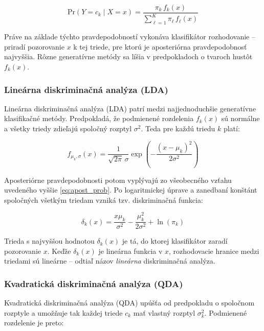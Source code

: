 \begin{equation}\label{eq:apost_prob}
\mathrm{Pr}(Y = c_k \mid X = x) = \frac{\pi_k \, f_k(x)}{\sum\limits_{\ell = 1}^{K} \pi_\ell \, f_\ell(x)}
\end{equation}

Práve na základe týchto pravdepodobností vykonáva klasifikátor rozhodovanie – priradí pozorovanie $x$ k tej triede, pre ktorú je aposteriórna pravdepodobnosť najvyššia. Rôzne generatívne metódy sa líšia v predpokladoch o tvaroch hustôt $f_k(x)$.

\subsubsection{Lineárna diskriminačná analýza (LDA)}
\label{subsubsec:lda}

Lineárna diskriminačná analýza (LDA) patrí medzi najjednoduchšie generatívne klasifikačné metódy. Predpokladá, že podmienené rozdelenia $f_k(x)$ sú normálne a všetky triedy zdieľajú spoločný rozptyl $\sigma^2$. Teda pre každú triedu $k$ platí:

\begin{equation}
f_{\mu_k,\sigma}(x) = \frac{1}{\sqrt{2\pi} \, \sigma} \exp\left( -\frac{(x - \mu_k)^2}{2\sigma^2} \right)
\end{equation}

Aposteriórne pravdepodobnosti potom vyplývajú zo všeobecného vzťahu uvedeného vyššie \eqref{eq:apost_prob}. Po logaritmickej úprave a zanedbaní konštánt spoločných všetkým triedam vzniká tzv. diskriminačná funkcia:

\begin{equation}
\delta_k(x) = \frac{x \mu_k}{\sigma^2} - \frac{\mu_k^2}{2\sigma^2} + \ln(\pi_k)
\end{equation}

Trieda s najvyššou hodnotou $\delta_k(x)$ je tá, do ktorej klasifikátor zaradí pozorovanie $x$. Keďže $\delta_k(x)$ je lineárna funkcia v $x$, rozhodovacie hranice medzi triedami sú lineárne – odtiaľ názov \textit{lineárna} diskriminačná analýza.

\subsubsection{Kvadratická diskriminačná analýza (QDA)}
\label{subsubsec:qda}

Kvadratická diskriminačná analýza (QDA) upúšťa od predpokladu o spoločnom rozptyle a umožňuje tak každej triede $c_k$ mať vlastný rozptyl $\sigma_k^2$. Podmienené rozdelenie je preto:

